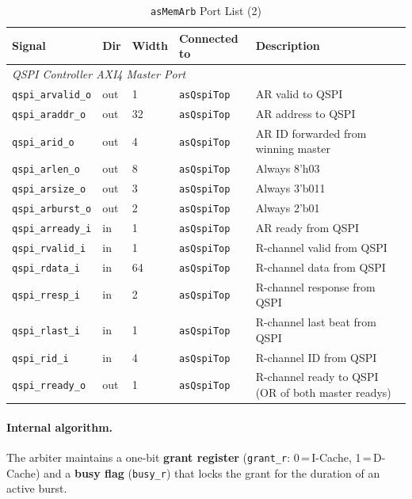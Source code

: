 \begin{table}[H]
\caption{\texttt{asMemArb} Port List (2)}
\label{tab:asMemArbPorts2}
\centering
\begin{tabularx}{\textwidth}{|X |l |l |X |X|}
  \hline
  Signal & Dir & Width & Connected to & Description \\
  \hline
  \hline
  \multicolumn{5}{|l|}{\textit{QSPI Controller AXI4 Master Port}} \\
  \hline
  \texttt{qspi\_arvalid\_o} & out & 1  & \texttt{asQspiTop} & AR valid to QSPI \\
  \hline
  \texttt{qspi\_araddr\_o}  & out & 32 & \texttt{asQspiTop} & AR address to QSPI \\
  \hline
  \texttt{qspi\_arid\_o}    & out & 4  & \texttt{asQspiTop} & AR ID forwarded from winning master \\
  \hline
  \texttt{qspi\_arlen\_o}   & out & 8  & \texttt{asQspiTop} & Always 8'h03 \\
  \hline
  \texttt{qspi\_arsize\_o}  & out & 3  & \texttt{asQspiTop} & Always 3'b011 \\
  \hline
  \texttt{qspi\_arburst\_o} & out & 2  & \texttt{asQspiTop} & Always 2'b01 \\
  \hline
  \texttt{qspi\_arready\_i} & in  & 1  & \texttt{asQspiTop} & AR ready from QSPI \\
  \hline
  \texttt{qspi\_rvalid\_i}  & in  & 1  & \texttt{asQspiTop} & R-channel valid from QSPI \\
  \hline
  \texttt{qspi\_rdata\_i}   & in  & 64 & \texttt{asQspiTop} & R-channel data from QSPI \\
  \hline
  \texttt{qspi\_rresp\_i}   & in  & 2  & \texttt{asQspiTop} & R-channel response from QSPI \\
  \hline
  \texttt{qspi\_rlast\_i}   & in  & 1  & \texttt{asQspiTop} & R-channel last beat from QSPI \\
  \hline
  \texttt{qspi\_rid\_i}     & in  & 4  & \texttt{asQspiTop} & R-channel ID from QSPI \\
  \hline
  \texttt{qspi\_rready\_o}  & out & 1  & \texttt{asQspiTop} & R-channel ready to QSPI (OR of both master readys) \\
  \hline
\end{tabularx}
\end{table}

\paragraph{Internal algorithm.}
The arbiter maintains a one-bit \textbf{grant register}
(\texttt{grant\_r}: 0\,=\,I-Cache, 1\,=\,D-Cache) and a
\textbf{busy flag} (\texttt{busy\_r}) that locks the grant for the
duration of an active burst.

